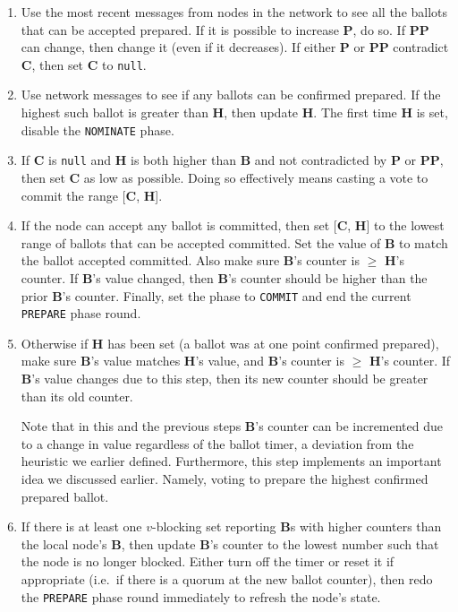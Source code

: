 \begin{enumerate}
    \item Use the most recent messages from nodes in the network to see all the ballots that can be accepted prepared. If it is possible to increase \textbf{P}, do so. If \textbf{PP} can change, then change it (even if it decreases). If either \textbf{P} or \textbf{PP} contradict \textbf{C}, then set \textbf{C} to {\tt null}.

    \item Use network messages to see if any ballots can be confirmed prepared. If the highest such ballot is greater than \textbf{H}, then update \textbf{H}. The first time \textbf{H} is set, disable the {\tt NOMINATE} phase.

    \item If \textbf{C} is {\tt null} and \textbf{H} is both higher than \textbf{B} and not contradicted by \textbf{P} or \textbf{PP}, then set \textbf{C} as low as possible. Doing so effectively means casting a vote to commit the range [\textbf{C}, \textbf{H}].

    \item If the node can accept any ballot is committed, then set [\textbf{C}, \textbf{H}] to the lowest range of ballots that can be accepted committed. Set the value of \textbf{B} to match the ballot accepted committed. Also make sure \textbf{B}'s counter is $\geq$ \textbf{H}'s counter. If \textbf{B}'s value changed, then \textbf{B}'s counter should be higher than the prior \textbf{B}'s counter. Finally, set the phase to {\tt COMMIT} and end the current {\tt PREPARE} phase round.

    \item Otherwise if \textbf{H} has been set (a ballot was at one point confirmed prepared), make sure \textbf{B}'s value matches \textbf{H}'s value, and \textbf{B}'s counter is $\geq$ \textbf{H}'s counter. If \textbf{B}'s value changes due to this step, then its new counter should be greater than its old counter.

    Note that in this and the previous steps \textbf{B}'s counter can be incremented due to a change in value regardless of the ballot timer, a deviation from the heuristic we earlier defined. Furthermore, this step implements an important idea we discussed earlier. Namely, voting to prepare the highest confirmed prepared ballot.

    \item If there is at least one $v$-blocking set reporting \textbf{B}s with higher counters than the local node's \textbf{B}, then update \textbf{B}'s counter to the lowest number such that the node is no longer blocked. Either turn off the timer or reset it if appropriate (i.e.\ if there is a quorum at the new ballot counter), then redo the {\tt PREPARE} phase round immediately to refresh the node's state.
\end{enumerate}

